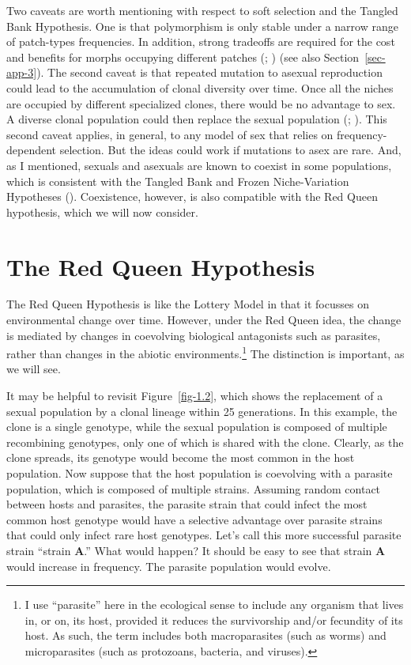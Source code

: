 \documentclass[
  letterpaper,
]{book}
\begin{document}
Two caveats are worth mentioning with respect to soft selection and the
Tangled Bank Hypothesis. One is that polymorphism is only stable under a
narrow range of patch-types frequencies. In addition, strong tradeoffs
are required for the cost and benefits for morphs occupying different
patches (;
) (see also
Section~\ref{sec-app-3}). The second caveat is that repeated mutation to
asexual reproduction could lead to the accumulation of clonal diversity
over time. Once all the niches are occupied by different specialized
clones, there would be no advantage to sex. A diverse clonal population
could then replace the sexual population (; ). This
second caveat applies, in general, to any model of sex that relies on
frequency-dependent selection. But the ideas could work if mutations to
asex are rare. And, as I mentioned, sexuals and asexuals are known to
coexist in some populations, which is consistent with the Tangled Bank
and Frozen Niche-Variation Hypotheses
().
Coexistence, however, is also compatible with the Red Queen hypothesis,
which we will now consider.

\section{The Red Queen Hypothesis}\label{the-red-queen-hypothesis}

The Red Queen Hypothesis is like the Lottery Model in that it focusses
on environmental change over time. However, under the Red Queen idea,
the change is mediated by changes in coevolving biological antagonists
such as parasites, rather than changes in the abiotic
environments.\footnote{I use ``parasite'' here in the ecological sense
  to include any organism that lives in, or on, its host, provided it
  reduces the survivorship and/or fecundity of its host. As such, the
  term includes both macroparasites (such as worms) and microparasites
  (such as protozoans, bacteria, and viruses).} The distinction is
important, as we will see.

It may be helpful to revisit Figure~\ref{fig-1.2}, which shows the
replacement of a sexual population by a clonal lineage within 25
generations. In this example, the clone is a single genotype, while the
sexual population is composed of multiple recombining genotypes, only
one of which is shared with the clone. Clearly, as the clone spreads,
its genotype would become the most common in the host population. Now
suppose that the host population is coevolving with a parasite
population, which is composed of multiple strains. Assuming random
contact between hosts and parasites, the parasite strain that could
infect the most common host genotype would have a selective advantage
over parasite strains that could only infect rare host genotypes. Let's
call this more successful parasite strain ``strain \textbf{A}.'' What
would happen? It should be easy to see that strain \textbf{A} would
increase in frequency. The parasite population would evolve.
\end{document}
